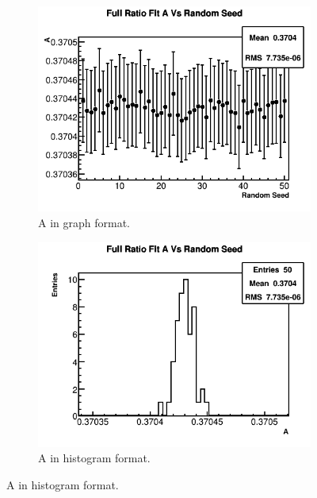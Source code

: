 		\begin{figure}[]
		\centering
		    \begin{subfigure}[t]{0.45\textwidth}
			    \centering
				\includegraphics[width=\textwidth]{RatioCBO_A_Vs_Iter_Canv}
			    \caption{A in graph format.}
		    \end{subfigure}
		    \hspace{4mm}
		    \begin{subfigure}[t]{0.45\textwidth}
			    \centering
				\includegraphics[width=\textwidth]{RatioCBO_A_Vs_Iter_Canv_hist}
			    \caption{A in histogram format.}
		    \end{subfigure}%
		   	\vspace{4mm}

\end{figure}
